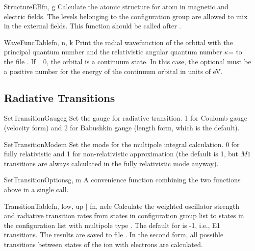 \begin{fundesc}{StructureEB}{fn, g}
Calculate the atomic structure for atom in magnetic and electric fields. The
levels belonging to the configuration group  are allowed to mix in the
external fields. This function should be called after .
\end{fundesc}

\begin{fundesc}{WaveFuncTable}{fn, n, k}
Print the radial wavefunction of the orbital with the principal quantum number
 and the relativistic angular quantum number $\kappa$= to the file
. If =0, the orbital is a continuum state. In this case, the
optional  must be a positive number for the energy of the continuum
orbital in units of eV.
\end{fundesc}


\subsection{Radiative Transitions}

\begin{fundesc}{SetTransitionGauge}{g}
Set the gauge for radiative transition. 1 for Coulomb gauge (velocity form) and
2 for Babushkin gauge (length form, which is the default).
\end{fundesc}

\begin{fundesc}{SetTransitionMode}{m}
Set the mode for the multipole integral calculation. 0 for fully relativistic
and 1 for non-relativistic approximation (the default is 1, but $M1$ transitions
are always calculated in the fully relativistic mode anyway).
\end{fundesc}

\begin{fundesc}{SetTransitionOptions}{g, m}
A convenience function combining the two functions above in a single call.
\end{fundesc}

\begin{fundesc}{TransitionTable}{fn, low, up $\mid$ fn, nele }
Calculate the weighted oscillator strength and radiative transition rates from
states in configuration group list  to states in the configuration list
 with multipole type . The default for  is -1, i.e., E1
transitions. The results are saved to file . In the second form, all
possible transitions between states of the ion with  electrons are
calculated.
\end{fundesc}

